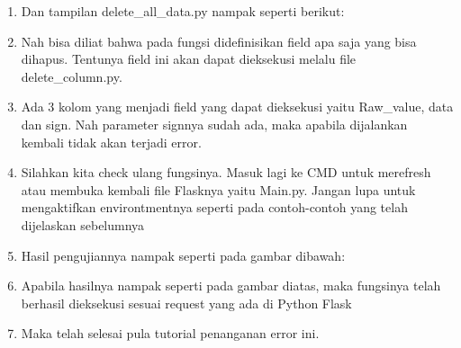 \begin{enumerate}
\item Dan tampilan delete\_all\_data.py nampak seperti berikut:
\item Nah bisa diliat bahwa pada fungsi didefinisikan field apa saja yang bisa dihapus. Tentunya field ini akan dapat dieksekusi melalu file delete\_column.py.
\item Ada 3 kolom yang menjadi field yang dapat dieksekusi yaitu Raw\_value, data dan sign. Nah parameter signnya sudah ada, maka apabila dijalankan kembali tidak akan terjadi error.
\item Silahkan kita check ulang fungsinya. Masuk lagi ke CMD untuk merefresh atau membuka kembali file Flasknya yaitu Main.py. Jangan lupa untuk mengaktifkan environtmentnya seperti pada contoh-contoh yang telah dijelaskan sebelumnya
\item Hasil pengujiannya nampak seperti pada gambar dibawah: 
\item Apabila hasilnya nampak seperti pada gambar diatas, maka fungsinya telah berhasil dieksekusi sesuai request yang ada di Python Flask
\item Maka telah selesai pula tutorial penanganan error ini.
\end{enumerate}